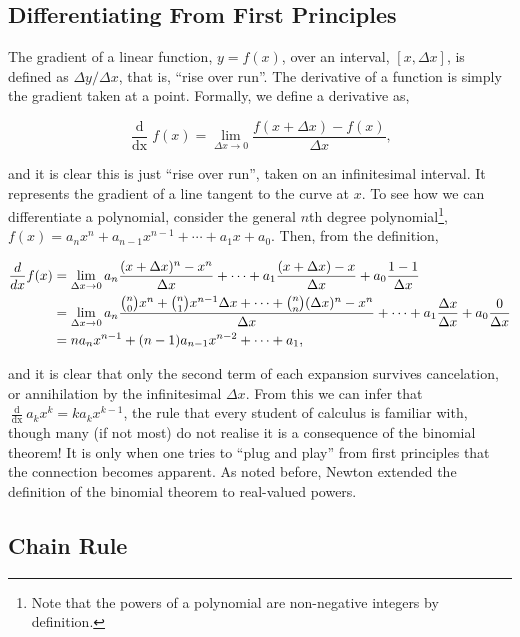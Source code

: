 \documentclass[11pt]{amsart}
\begin{document}
\subsection{Differentiating From First Principles}

The gradient of a linear function, $y = f(x)$, over an interval, $[x, \Delta x]$, is defined as $\Delta y / \Delta x$, that is, ``rise over run''. The derivative of a function is simply the gradient taken at a point. Formally, we define a derivative as,

$$\frac{\mathop{d}}{\mathop{dx}} f(x) = \lim_{\Delta x \to 0} \frac{f(x  + \Delta x) - f(x)}{\Delta x},$$

and it is clear this is just ``rise over run'', taken on an infinitesimal interval. It represents the gradient of a line tangent to the curve at $x$. To see how we can differentiate a polynomial, consider the general $n$th degree polynomial\footnote{Note that the powers of a polynomial are non-negative integers by definition.}, $f(x) = a_nx^n + a_{n-1}x^{n-1} + \cdots + a_1x + a_0$. Then, from the definition,

\begin{align}
\frac{\mathop{d}}{\mathop{dx}} f(x) &= \lim_{\Delta x \to 0} a_n\frac{(x + \Delta x)^n - x^n}{\Delta x} + \cdots + a_1\frac{(x + \Delta x) - x}{\Delta x} + a_0\frac{1 - 1}{\Delta x}\notag \\
&= \lim_{\Delta x \to 0} a_n\frac{{{n}\choose{0}}x^n + {{n}\choose{1}}x^{n-1}\Delta x + \cdots + {{n}\choose{n}}(\Delta x)^n - x^n}{\Delta x} + \cdots + a_1\frac{\Delta x}{\Delta x} + a_0\frac{0}{\Delta x} \notag \\
&= na_nx^{n-1} + (n-1)a_{n-1}x^{n-2} + \cdots + a_1, \notag
\end{align}

and it is clear that only the second term of each expansion survives cancelation, or annihilation by the infinitesimal $\Delta x$. From this we can infer that $\frac{\mathop{d}}{\mathop{dx}} a_kx^k = ka_kx^{k-1}$, the rule that every student of calculus is familiar with, though many (if not most) do not realise it is a consequence of the binomial theorem! It is only when one tries to ``plug and play'' from first principles that the connection becomes apparent. As noted before, Newton extended the definition of the binomial theorem to real-valued powers.

\subsection{Chain Rule}
\end{document}
